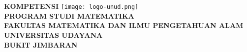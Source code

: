 \chapter*{\centering\normalsize\textbf{\MakeUppercase{\Judul}}}
\begin{center}
    \vspace{3em}
    \textbf{KOMPETENSI \MakeUppercase{\Kompetensi}}\vfill
    \texttt{[image: logo-unud.png]}\vfill
    \textbf{\MakeUppercase{\Nama}}\\
    \textbf{\NIM}\vfill
    \textbf{
        PROGRAM STUDI MATEMATIKA\\
        FAKULTAS MATEMATIKA DAN ILMU PENGETAHUAN ALAM\\
        UNIVERSITAS UDAYANA\\
        BUKIT JIMBARAN\\
        \the\year
    }\\\vfill
\end{center}



